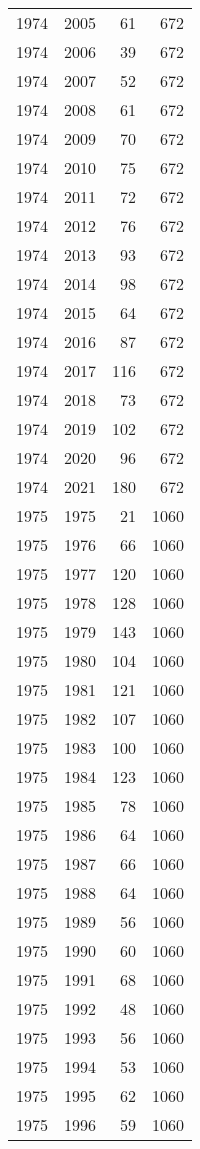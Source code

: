 \documentclass[
  11pt,
  letterpaper,
  DIV=11,
  numbers=noendperiod,
  twoside]{scrartcl}
\begin{document}
\begin{longtable}[]{@{}rrrr@{}}
1974 & 2005 & 61 & 672 \\
1974 & 2006 & 39 & 672 \\
1974 & 2007 & 52 & 672 \\
1974 & 2008 & 61 & 672 \\
1974 & 2009 & 70 & 672 \\
1974 & 2010 & 75 & 672 \\
1974 & 2011 & 72 & 672 \\
1974 & 2012 & 76 & 672 \\
1974 & 2013 & 93 & 672 \\
1974 & 2014 & 98 & 672 \\
1974 & 2015 & 64 & 672 \\
1974 & 2016 & 87 & 672 \\
1974 & 2017 & 116 & 672 \\
1974 & 2018 & 73 & 672 \\
1974 & 2019 & 102 & 672 \\
1974 & 2020 & 96 & 672 \\
1974 & 2021 & 180 & 672 \\
1975 & 1975 & 21 & 1060 \\
1975 & 1976 & 66 & 1060 \\
1975 & 1977 & 120 & 1060 \\
1975 & 1978 & 128 & 1060 \\
1975 & 1979 & 143 & 1060 \\
1975 & 1980 & 104 & 1060 \\
1975 & 1981 & 121 & 1060 \\
1975 & 1982 & 107 & 1060 \\
1975 & 1983 & 100 & 1060 \\
1975 & 1984 & 123 & 1060 \\
1975 & 1985 & 78 & 1060 \\
1975 & 1986 & 64 & 1060 \\
1975 & 1987 & 66 & 1060 \\
1975 & 1988 & 64 & 1060 \\
1975 & 1989 & 56 & 1060 \\
1975 & 1990 & 60 & 1060 \\
1975 & 1991 & 68 & 1060 \\
1975 & 1992 & 48 & 1060 \\
1975 & 1993 & 56 & 1060 \\
1975 & 1994 & 53 & 1060 \\
1975 & 1995 & 62 & 1060 \\
1975 & 1996 & 59 & 1060 \\

\end{longtable}
\end{document}
